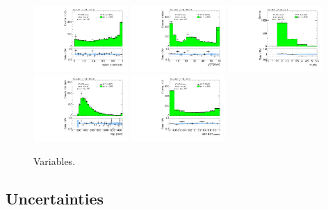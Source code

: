 \begin{figure}[tp]
  \includegraphics[width=0.32\textwidth]{figures/analysis/vbf-MCXSR/lep-eta-centrality}
  \includegraphics[width=0.32\textwidth]{figures/analysis/vbf-MCXSR/system-pt}
  \includegraphics[width=0.32\textwidth]{figures/analysis/vbf-MCXSR/n-jets30}
  \includegraphics[width=0.32\textwidth]{figures/analysis/vbf-MCXSR/dijet-m-high}
  \includegraphics[width=0.32\textwidth]{figures/analysis/vbf-MCXSR/BDTEve-VBF}
  \caption{Variables.}
  \label{fig:backgrounds-MCXSR-jets}
\end{figure}

\clearpage

\subsection{Uncertainties}

